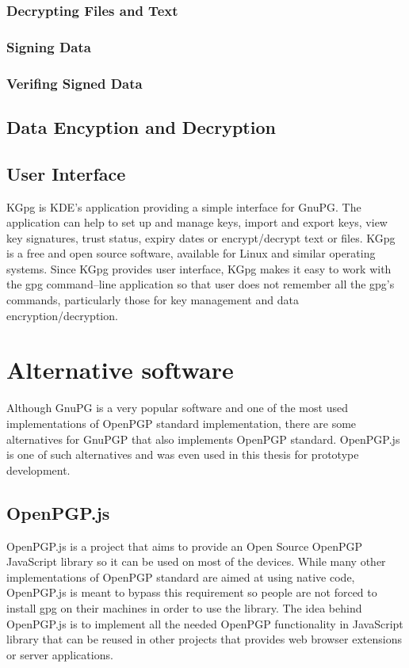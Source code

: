 \subsubsection*{Decrypting Files and Text}


\subsubsection*{Signing Data}


\subsubsection*{Verifing Signed Data}


\subsection*{Data Encyption and Decryption}


\subsection*{User Interface}
KGpg is KDE's application providing a simple interface for GnuPG. The application can help to set up and manage keys, import and export keys, view key signatures, trust status, expiry dates or encrypt/decrypt text or files. KGpg is a free and open source software, available for Linux and similar operating systems. Since KGpg provides user interface, KGpg makes it easy to work with the gpg command--line application so that user does not remember all the gpg's commands, particularly those for key management and data encryption/decryption. \cite{KGpg}

\section{Alternative software}
Although GnuPG is a very popular software and one of the most used implementations of OpenPGP standard implementation, there are some alternatives for GnuPGP that also implements OpenPGP standard. OpenPGP.js is one of such alternatives and was even used in this thesis for prototype development.

\subsection*{OpenPGP.js}
OpenPGP.js is a project that aims to provide an Open Source OpenPGP JavaScript library so it can be used on most of the devices. While many other implementations of OpenPGP standard are aimed at using native code, OpenPGP.js is meant to bypass this requirement so people are not forced to install gpg on their machines in order to use the library. The idea behind OpenPGP.js is to implement all the needed OpenPGP functionality in JavaScript library that can be reused in other projects that provides web browser extensions or server applications. \cite{OpenPGPjs}


